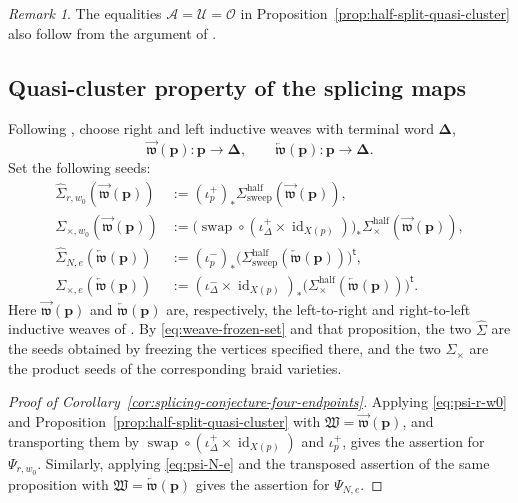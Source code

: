 \documentclass[10pt,a4paper]{article}
\theoremstyle{definition}
\theoremstyle{remark}
\newtheorem{remark}[theorem]{Remark}
\newcommand{\fW}{\mathfrak W}
\newcommand{\rind}[1]{\overrightarrow{\mathfrak w}(#1)}
\newcommand{\lind}[1]{\overleftarrow{\mathfrak w}(#1)}
\newcommand{\id}{\operatorname{id}}
\begin{document}
\begin{remark}
The equalities \(\mathcal A=\mathcal U=\mathcal O\) in
Proposition~\ref{prop:half-split-quasi-cluster} also follow from the argument of
\cite[Proposition~5.9 and the proof of Lemma~5.7]
{GorskyKimScrogginSimental2025}.
\end{remark}

\subsection{Quasi-cluster property of the splicing maps}

Following \cite[Definition~4.5 and Section~6.4]{CasalsEtAlBraidVarieties},
choose right and left inductive weaves with terminal word
\(\boldsymbol\Delta\),
\[
 \rind{\mathbf p}:\mathbf p\longrightarrow\boldsymbol\Delta,
 \qquad
 \lind{\mathbf p}:\mathbf p\longrightarrow\boldsymbol\Delta.
\]
Set the following seeds:
\begin{align*}
 \widehat{\Sigma}_{r,w_0}(\rind{\mathbf p})
 &:=
 (\iota_p^+)_*
 \Sigma_{\mathrm{sweep}}^{\mathrm{half}}(\rind{\mathbf p}),\\
 \Sigma_{\times,w_0}(\rind{\mathbf p})
 &:=
 \bigl(\operatorname{swap}\circ
       (\iota_{\Delta}^+\times\id_{X(p)})\bigr)_*
 \Sigma_{\times}^{\mathrm{half}}(\rind{\mathbf p}),\\
 \widehat{\Sigma}_{N,e}(\lind{\mathbf p})
 &:=
 (\iota_p^-)_*
 \bigl(\Sigma_{\mathrm{sweep}}^{\mathrm{half}}
       (\lind{\mathbf p})\bigr)^{\mathsf t},\\
 \Sigma_{\times,e}(\lind{\mathbf p})
 &:=
 (\iota_{\Delta}^-\times\id_{X(p)})_*
 \bigl(\Sigma_{\times}^{\mathrm{half}}
       (\lind{\mathbf p})\bigr)^{\mathsf t}.
\end{align*}
Here \(\rind{\mathbf p}\) and \(\lind{\mathbf p}\) are, respectively, the
left-to-right and right-to-left inductive weaves of
\cite[Proposition~5.9]{GorskyKimScrogginSimental2025}.  By
\eqref{eq:weave-frozen-set} and that proposition, the two
\(\widehat{\Sigma}\) are the seeds obtained by freezing the vertices specified
there, and the two \(\Sigma_\times\) are the product
seeds of the corresponding braid varieties.

\begin{proof}[Proof of Corollary~\ref{cor:splicing-conjecture-four-endpoints}]
Applying \eqref{eq:psi-r-w0} and
Proposition~\ref{prop:half-split-quasi-cluster} with
\(\fW=\rind{\mathbf p}\), and transporting them by
\(\operatorname{swap}\circ(\iota_\Delta^+\times\id_{X(p)})\) and
\(\iota_p^+\), gives the assertion for \(\Psi_{r,w_0}\).  Similarly,
applying \eqref{eq:psi-N-e} and the transposed assertion of the same
proposition with \(\fW=\lind{\mathbf p}\) gives the assertion for
\(\Psi_{N,e}\).
\end{proof}
\end{document}
